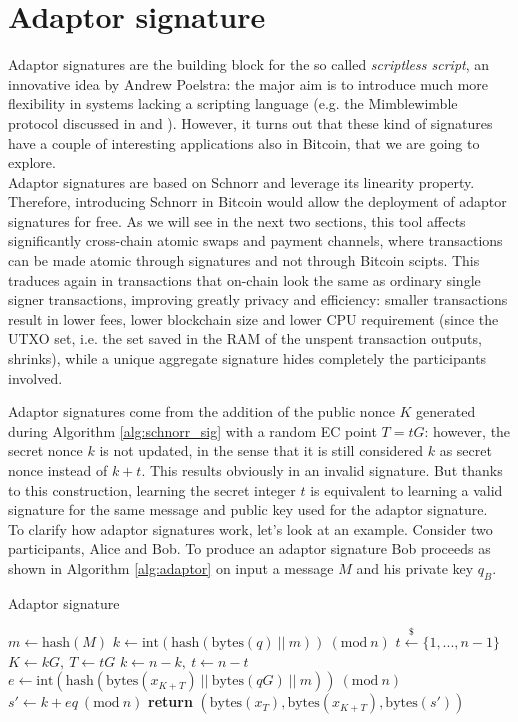 \bigskip

\section{Adaptor signature}
\label{adaptor}
Adaptor signatures are the building block for the so called \textit{scriptless script}, an innovative idea by Andrew Poelstra: the major aim is to introduce much more flexibility in systems lacking a scripting language (e.g. the Mimblewimble protocol discussed in \cite{MW1} and \cite{MW2}). However, it turns out that these kind of signatures have a couple of interesting applications also in Bitcoin, that we are going to explore.
\\
Adaptor signatures are based on Schnorr and leverage its linearity property. Therefore, introducing Schnorr in Bitcoin would allow the deployment of adaptor signatures for free. As we will see in the next two sections, this tool affects significantly cross-chain atomic swaps and payment channels, where transactions can be made atomic through signatures and not through Bitcoin scipts. This traduces again in transactions that on-chain look the same as ordinary single signer transactions, improving greatly privacy and efficiency: smaller transactions result in lower fees, lower blockchain size and lower CPU requirement (since the UTXO set, i.e. the set saved in the RAM of the unspent transaction outputs, shrinks), while a unique aggregate signature hides completely the participants involved.

\bigskip
\noindent
Adaptor signatures come from the addition of the public nonce $K$ generated during Algorithm \ref{alg:schnorr_sig} with a random EC point $T = tG$: however, the secret nonce $k$ is not updated, in the sense that it is still considered $k$ as secret nonce instead of $k + t$. This results obviously in an invalid signature. But thanks to this construction, learning the secret integer $t$ is equivalent to learning a valid signature for the same message and public key used for the adaptor signature.
\\
To clarify how adaptor signatures work, let's look at an example. Consider two participants, Alice and Bob. To produce an adaptor signature Bob proceeds as shown in Algorithm \ref{alg:adaptor} on input a message $M$ and his private key $q_B$.

\begin{algorithm}
	\caption{Adaptor signature}
	\label{alg:adaptor}
	\begin{algorithmic}[1]
		\State $m \gets \text{hash}(M)$
		\State $k \gets \text{int}(\text{hash}(\text{bytes}(q) \ || \ m)) \ (\text{mod} \ n)$
		\State $t \xleftarrow{\text{\$}} \{1, ..., n - 1\}$
		\State $K \gets kG, \ T \gets tG$
		\State $k \gets n - k, \ t \gets n - t$
		\EndIf
		\State $e \gets \text{int}(\text{hash}(\text{bytes}(x_{K + T}) \ || \ \text{bytes}(qG) \ || \ m)) \ (\text{mod} \ n)$
		\State $s' \gets k + eq \ (\text{mod} \ n)$
		\State \textbf{return} $(\text{bytes}(x_T), \text{bytes}(x_{K + T}), \text{bytes}(s'))$
		\EndProcedure
	\end{algorithmic}
\end{algorithm}

